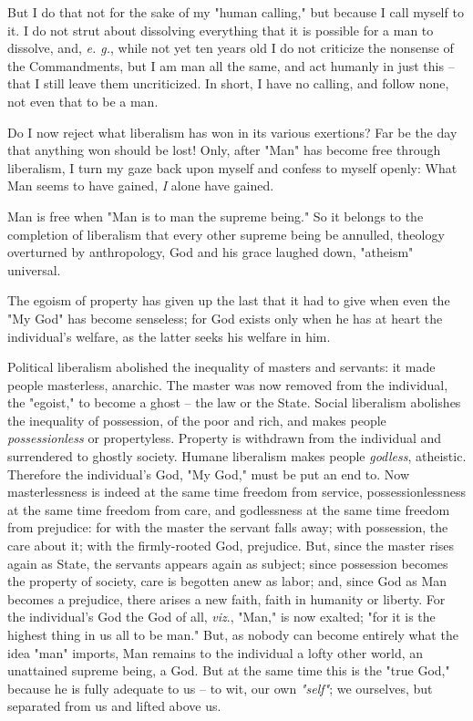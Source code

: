 But I do that not for the sake of my "{}human calling,"{} but because I call 
myself to it. I do not strut about dissolving everything that it is possible 
for a man to dissolve, and, \textit{e. g.}, while not yet ten years old I do 
not criticize the nonsense of the Commandments, but I am man all the same, and 
act humanly in just this -- that I still leave them uncriticized. In short, I 
have no calling, and follow none, not even that to be a man.

Do I now reject what liberalism has won in its various exertions? Far be the 
day that anything won should be lost! Only, after "{}Man"{} has become free 
through liberalism, I turn my gaze back upon myself and confess to myself 
openly: What Man seems to have gained, \textit{I} alone have gained.

Man is free when "{}Man is to man the supreme being."{} So it belongs to the 
completion of liberalism that every other supreme being be annulled, theology 
overturned by anthropology, God and his grace laughed down, "{}atheism"{} 
universal.

The egoism of property has given up the last that it had to give when even the 
"{}My God"{} has become senseless; for God exists only when he has at heart 
the individual's welfare, as the latter seeks his welfare in him.

Political liberalism abolished the inequality of masters and servants: it made 
people masterless, anarchic. The master was now removed from the individual, 
the "{}egoist,"{} to become a ghost -- the law or the State. Social liberalism 
abolishes the inequality of possession, of the poor and rich, and makes people 
\textit{possessionless} or propertyless. Property is withdrawn from the 
individual and surrendered to ghostly society. Humane liberalism makes people 
\textit{godless}, atheistic. Therefore the individual's God, "{}My God,"{} 
must be put an end to. Now masterlessness is indeed at the same time freedom 
from service, possessionlessness at the same time freedom from care, and 
godlessness at the same time freedom from prejudice: for with the master the 
servant falls away; with possession, the care about it; with the firmly-rooted 
God, prejudice. But, since the master rises again as State, the servants 
appears again as subject; since possession becomes the property of society, 
care is begotten anew as labor; and, since God as Man becomes a prejudice, 
there arises a new faith, faith in humanity or liberty. For the individual's 
God the God of all, \textit{viz}., "{}Man,"{} is now exalted; "{}for it is the 
highest thing in us all to be man."{} But, as nobody can become entirely what 
the idea "{}man"{} imports, Man remains to the individual a lofty other world, 
an unattained supreme being, a God. But at the same time this is the "{}true 
God,"{} because he is fully adequate to us -- to wit, our own 
\textit{"{}self"{}}; we ourselves, but separated from us and lifted above us.

